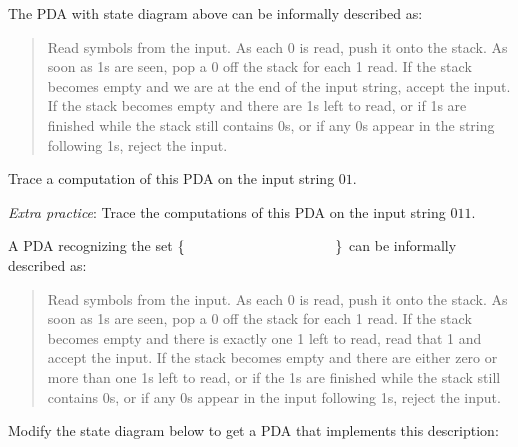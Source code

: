 \documentclass[12pt, oneside]{article}
\begin{document}
The PDA with state diagram above can be informally described as:
\begin{quote}
    Read symbols from the input. As each 0 is read, push it onto the stack. 
    As soon as 1s are seen, pop a 0 off the stack for each 1 read. 
    If the stack becomes empty and we are at the end of the input string, accept the input. 
    If the stack becomes empty and there are 1s left to read, 
    or if 1s are finished while the stack still contains 0s, or if any 0s
    appear in the string following 1s, 
    reject the input.
\end{quote}
    

Trace a computation of this PDA on the input string $01$.

\vfill
    
{\it Extra practice}: Trace the computations of this PDA on the input string $011$.

\vfill

\newpage
A PDA recognizing the set $\{ \hspace{1.5 in} \}$ can be informally described as:
\begin{quote}
    Read symbols from the input. As each 0 is read, push it onto the stack. 
    As soon as 1s are seen, pop a 0 off the stack for each 1 read. 
    If the stack becomes empty and there is exactly one 1 left to read, read that 1 and accept the input. 
    If the stack becomes empty and there are either zero or more than one 1s left to read, 
    or if the 1s are finished while the stack still contains 0s, or if any 0s appear in the input following 1s, 
    reject the input.
\end{quote}
Modify the state diagram below to get a PDA that implements this description:

    
 \vfill
\end{document}
